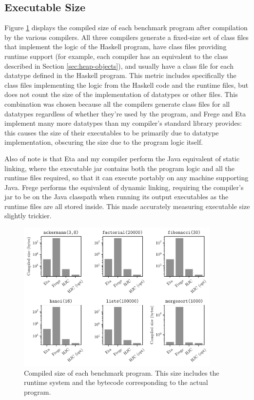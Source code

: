 \documentclass[dissertation.tex]{subfiles}
\begin{document}
{{    }
    \subsection{Executable Size}
    {

        Figure \ref{fig:executable-size} displays the compiled size of each benchmark program after compilation by the
        various compilers. All three compilers generate a fixed-size set of class files that implement the logic of the
        Haskell program, have class files providing runtime support (for example, each compiler has an equivalent to the
         class described in Section \ref{sec:heap-objects}), and usually have a class file for each
        datatype defined in the Haskell program. This metric includes specifically the class files implementing the
        logic from the Haskell code and the runtime files, but does not count the size of the implementation of
        datatypes or other files. This combination was chosen because all the compilers generate class files for all
        datatypes regardless of whether they're used by the program, and Frege and Eta implement many more datatypes
        than my compiler's standard library provides: this causes the size of their executables to be primarily due to
        datatype implementation, obscuring the size due to the program logic itself.

        Also of note is that Eta and my compiler perform the Java equivalent of static linking, where the executable jar
        contains both the program logic and all the runtime files required, so that it can execute portably on any
        machine supporting Java. Frege performs the equivalent of dynamic linking, requiring the compiler's jar to be on
        the Java classpath when running its output executables as the runtime files are all stored inside. This made
        accurately measuring executable size slightly trickier.

        \begin{figure}[h]
            \centering
            \captionsetup{width=0.8\textwidth}
            \includegraphics[width=0.9\textwidth]{graphs/size.pdf}
            \caption{Compiled size of each benchmark program. This size includes the runtime system and the bytecode corresponding to the actual program.}
            \label{fig:executable-size}
        \end{figure}

}}
\end{document}
